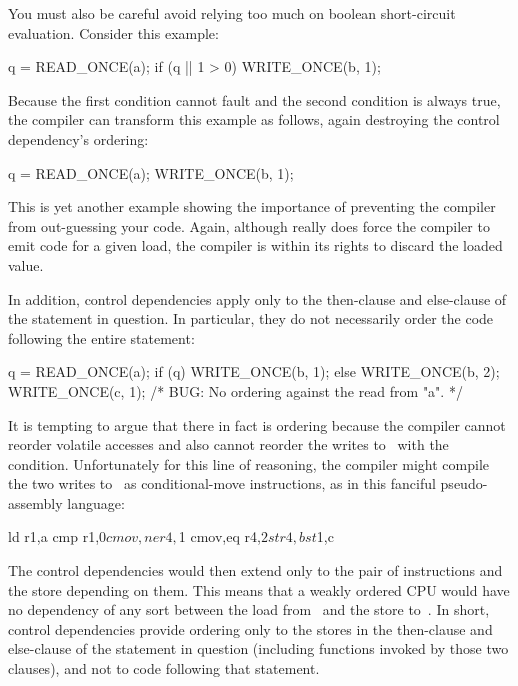 You must also be careful avoid relying too much on boolean short-circuit
evaluation.
Consider this example:

\begin{VerbatimU}
	q = READ_ONCE(a);
	if (q || 1 > 0)
		WRITE_ONCE(b, 1);
\end{VerbatimU}

Because the first condition cannot fault and the second condition is
always true, the compiler can transform this example as follows, again
destroying the control dependency's ordering:

\begin{VerbatimU}
	q = READ_ONCE(a);
	WRITE_ONCE(b, 1);
\end{VerbatimU}

This is yet another example showing the importance of preventing the
compiler from out-guessing your code.
Again, although  really does force the compiler to emit
code for a given load, the compiler is within its rights to discard the
loaded value.

In addition, control dependencies apply only to the then-clause and
else-clause of the  statement in question.
In particular, they do not necessarily order the code following the
entire  statement:

\begin{VerbatimU}
	q = READ_ONCE(a);
	if (q) {
		WRITE_ONCE(b, 1);
	} else {
		WRITE_ONCE(b, 2);
	}
	WRITE_ONCE(c, 1);  /* BUG: No ordering against the read from "a". */
\end{VerbatimU}

It is tempting to argue that there in fact is ordering because the
compiler cannot reorder volatile accesses and also cannot reorder
the writes to~ with the condition.
Unfortunately for this line of reasoning, the compiler might compile
the two writes to~ as conditional-move instructions, as in this
fanciful pseudo-assembly language:

\begin{VerbatimU}
	ld r1,a
	cmp r1,$0
	cmov,ne r4,$1
	cmov,eq r4,$2
	st r4,b
	st $1,c
\end{VerbatimU}

The control dependencies would then extend only to the pair of 
instructions and the store depending on them.
This means that a weakly ordered CPU would have no dependency of any sort
between the load from~ and the store to~.
In short, control dependencies provide ordering only to the stores in
the then-clause and else-clause of the  statement in question
(including functions invoked by those two clauses), and not to code
following that  statement.


